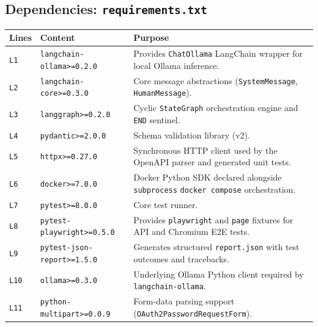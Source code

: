 \documentclass[11pt,a4paper]{article}
\begin{document}
\subsection{Dependencies: \texttt{requirements.txt}}
\begin{longtable}{L{1.4cm} L{5.2cm} L{9.0cm}}
\toprule
\textbf{Lines} & \textbf{Content} & \textbf{Purpose} \\
\midrule
\endhead
\texttt{L1} & \texttt{langchain-ollama>=0.2.0} & Provides \texttt{ChatOllama} LangChain wrapper for local Ollama inference. \\
\texttt{L2} & \texttt{langchain-core>=0.3.0} & Core message abstractions (\texttt{SystemMessage}, \texttt{HumanMessage}). \\
\texttt{L3} & \texttt{langgraph>=0.2.0} & Cyclic \texttt{StateGraph} orchestration engine and \texttt{END} sentinel. \\
\texttt{L4} & \texttt{pydantic>=2.0.0} & Schema validation library (v2). \\
\texttt{L5} & \texttt{httpx>=0.27.0} & Synchronous HTTP client used by the OpenAPI parser and generated unit tests. \\
\texttt{L6} & \texttt{docker>=7.0.0} & Docker Python SDK declared alongside \texttt{subprocess} \texttt{docker compose} orchestration. \\
\texttt{L7} & \texttt{pytest>=8.0.0} & Core test runner. \\
\texttt{L8} & \texttt{pytest-playwright>=0.5.0} & Provides \texttt{playwright} and \texttt{page} fixtures for API and Chromium E2E tests. \\
\texttt{L9} & \texttt{pytest-json-report>=1.5.0} & Generates structured \texttt{report.json} with test outcomes and tracebacks. \\
\texttt{L10} & \texttt{ollama>=0.3.0} & Underlying Ollama Python client required by \texttt{langchain-ollama}. \\
\texttt{L11} & \texttt{python-multipart>=0.0.9} & Form-data parsing support (\texttt{OAuth2PasswordRequestForm}). \\
\bottomrule
\end{longtable}

\end{document}
